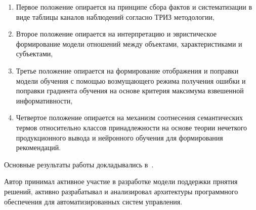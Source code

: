 {}
\begin{enumerate}[beginpenalty=10000] %
  \item Первое положение опирается на принципе сбора фактов и систематизации в виде таблицы каналов наблюдений согласно ТРИЗ методологии,
  \item Второе положение опирается на интерпретацию и эвристическое формирование модели отношений между объектами, характеристиками и субъектами,
  \item Третье положение опирается на формирование отображения и поправки модели обучения с помощью возмущающего режима получения ошибки и поправки градиента обучения на основе критерия максимума взвешенной информативности,
  \item Четвертое положение опирается на механизм соотнесения семантических термов относительно классов принадлежности на основе теории нечеткого продукционного вывода и нейронного обучения для формирования рекомендаций.
\end{enumerate}


{\probation}
Основные результаты работы докладывались в~\cite{aaij2022searches, baptista2021angular, leite2021observation,baptista2021searches,collaboration2021measurement,baptista2021measurement,aaij2021precision,aaij2022identification,bediaga2020measurement, aaij2021constraints,   onderwater2020study, aaij2022arxiv,     aaij2019arxiv,aaij2021evidence,aaij2020aps,baptista2021observation,baptista2021search,aaij2020isospin,  aaij2019precision,aaij2019search, lhcb2108evidence,aaij2022study,         aaij2022first,aaij2022j,  aaij2022observation, aaij2022tests}.


{\contribution} Автор принимал активное участие в разработке модели поддержки прнятия решений, активно разрабатывал и анализировал архитектуры программного обеспечения для автоматизированных систем управления. 

